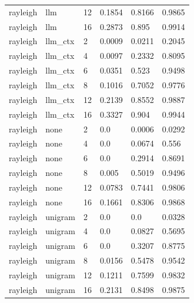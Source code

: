 \begin{tabular}{llllll}
rayleigh & llm & 12 & 0.1854 & 0.8166 & 0.9865 \\
rayleigh & llm & 16 & 0.2873 & 0.895 & 0.9914 \\
rayleigh & llm\_ctx & 2 & 0.0009 & 0.0211 & 0.2045 \\
rayleigh & llm\_ctx & 4 & 0.0097 & 0.2332 & 0.8095 \\
rayleigh & llm\_ctx & 6 & 0.0351 & 0.523 & 0.9498 \\
rayleigh & llm\_ctx & 8 & 0.1016 & 0.7052 & 0.9776 \\
rayleigh & llm\_ctx & 12 & 0.2139 & 0.8552 & 0.9887 \\
rayleigh & llm\_ctx & 16 & 0.3327 & 0.904 & 0.9944 \\
rayleigh & none & 2 & 0.0 & 0.0006 & 0.0292 \\
rayleigh & none & 4 & 0.0 & 0.0674 & 0.556 \\
rayleigh & none & 6 & 0.0 & 0.2914 & 0.8691 \\
rayleigh & none & 8 & 0.005 & 0.5019 & 0.9496 \\
rayleigh & none & 12 & 0.0783 & 0.7441 & 0.9806 \\
rayleigh & none & 16 & 0.1661 & 0.8306 & 0.9868 \\
rayleigh & unigram & 2 & 0.0 & 0.0 & 0.0328 \\
rayleigh & unigram & 4 & 0.0 & 0.0827 & 0.5695 \\
rayleigh & unigram & 6 & 0.0 & 0.3207 & 0.8775 \\
rayleigh & unigram & 8 & 0.0156 & 0.5478 & 0.9542 \\
rayleigh & unigram & 12 & 0.1211 & 0.7599 & 0.9832 \\
rayleigh & unigram & 16 & 0.2131 & 0.8498 & 0.9875 \\
\hline
\end{tabular}
